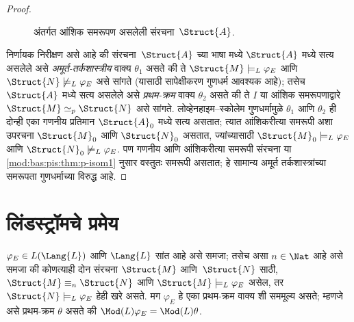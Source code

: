\begin{proof}
\begin{figure}[h]
  \centering
  \caption{अंतर्गत आंशिक समरूपण असलेली संरचना~$\Struct{A}$.}
\end{figure}

निर्णायक निरीक्षण असे आहे की संरचना~$\Struct{A}$ च्या
भाषा मध्ये $\Struct{A}$ मध्ये सत्य असलेले असे
\emph{अमूर्त-तर्कशास्त्रीय} वाक्य $\theta_1$ असते की ते
$\Struct{M} \models_L \varphi_{E}$ आणि $\Struct{N} \not\models_L \varphi_{E}$ असे
सांगते (यासाठी सापेक्षीकरण गुणधर्म आवश्यक आहे); तसेच $\Struct{A}$ मध्ये
सत्य असलेले असे \emph{प्रथम-क्रम} वाक्य $\theta_2$ असते की ते
$I$ या आंशिक समरूपणाद्वारे $\Struct{M} \simeq_p \Struct{N}$ असे
सांगते. लोव्हेनहाइम--स्कोलेम गुणधर्मामुळे $\theta_1$ आणि $\theta_2$ ही दोन्ही
एका गणनीय प्रतिमान $\Struct{A}_0$ मध्ये सत्य असतात; त्यात
आंशिकरीत्या समरूपी अशा उपरचना $\Struct{M}_0$ आणि $\Struct{N}_0$ असतात,
ज्यांच्यासाठी $\Struct{M}_0 \models_L \varphi_{E}$ आणि $\Struct{N}_0
\not\models_L \varphi_{E}$. पण गणनीय आणि आंशिकरीत्या समरूपी
संरचना या \ref{mod:bas:pis:thm:p-isom1} नुसार वस्तुतः समरूपी
असतात; हे सामान्य अमूर्त तर्कशास्त्रांच्या समरूपता गुणधर्माच्या विरुद्ध
आहे.


\end{proof}












\section{लिंडस्ट्रॉमचे प्रमेय}\label{mod:lin:prf:sec}

\begin{lem}
\label{mod:lin:prf:lem:lindstrom}
$\varphi_{E} \in L(\Lang{L})$ आणि $\Lang{L}$ सांत आहे असे समजा; तसेच असा
$n \in \Nat$ आहे असे समजा की कोणत्याही दोन संरचना
$\Struct{M}$ आणि~$\Struct{N}$ साठी, $\Struct{M} \equiv_n
\Struct{N}$ आणि $\Struct{M} \models_L \varphi_{E}$ असेल, तर $\Struct{N}
\models_L \varphi_{E}$ हेही खरे असते. मग $\varphi_{E}$ हे एका प्रथम-क्रम
वाक्य शी सममूल्य असते; म्हणजे असे प्रथम-क्रम $\theta$ असते की
$\Mod(L){\varphi_{E}} = \Mod(L){\theta}$.
\end{lem}

